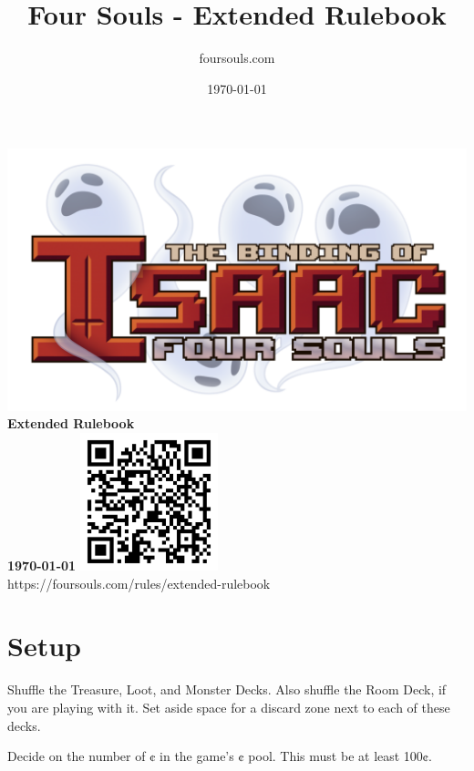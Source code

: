 \documentclass[a4paper, twoside]{report} %
\title{Four Souls - Extended Rulebook} %
\author{foursouls.com} %
\date{\today} %
\begin{document}
    \begin{titlepage}
        \centering
        \vfill
        \includegraphics[width=\textwidth]{assets/foursouls.png}
        \vskip2cm
        {\bfseries\LARGE
        Extended Rulebook\\
        \vskip5mm
        \Large
        \today
        }
        \vskip2cm
        \includegraphics[width=4cm]{assets/qr-code.pdf}\\
        https://foursouls.com/rules/extended-rulebook
    \end{titlepage}
    \tableofcontents
    \cleardoublepage

    \chapter{Setup}
    \label{setup}
    Shuffle the Treasure, Loot, and Monster Decks. Also shuffle the Room Deck, if you are playing with it. Set aside space for a discard zone next to each of these decks.

    Decide on the number of ¢ in the game’s ¢ pool. This must be at least 100¢.
\end{document}
